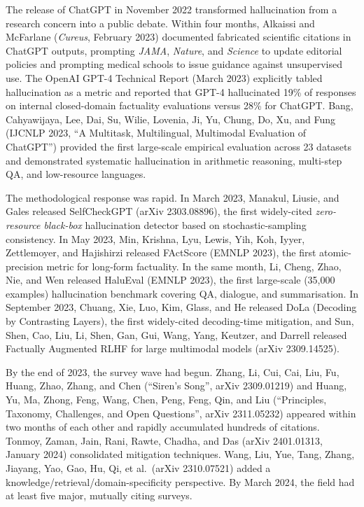 The release of ChatGPT in November 2022 transformed hallucination from a research concern into a public debate. Within four months, Alkaissi and McFarlane (\emph{Cureus}, February 2023) documented fabricated scientific citations in ChatGPT outputs, prompting \emph{JAMA}, \emph{Nature}, and \emph{Science} to update editorial policies and prompting medical schools to issue guidance against unsupervised use. The OpenAI GPT-4 Technical Report (March 2023) explicitly tabled hallucination as a metric and reported that GPT-4 hallucinated 19\% of responses on internal closed-domain factuality evaluations versus 28\% for ChatGPT. Bang, Cahyawijaya, Lee, Dai, Su, Wilie, Lovenia, Ji, Yu, Chung, Do, Xu, and Fung (IJCNLP 2023, ``A Multitask, Multilingual, Multimodal Evaluation of ChatGPT'') provided the first large-scale empirical evaluation across 23 datasets and demonstrated systematic hallucination in arithmetic reasoning, multi-step QA, and low-resource languages.

The methodological response was rapid. In March 2023, Manakul, Liusie, and Gales released SelfCheckGPT (arXiv 2303.08896), the first widely-cited \emph{zero-resource black-box} hallucination detector based on stochastic-sampling consistency. In May 2023, Min, Krishna, Lyu, Lewis, Yih, Koh, Iyyer, Zettlemoyer, and Hajishirzi released FActScore (EMNLP 2023), the first atomic-precision metric for long-form factuality. In the same month, Li, Cheng, Zhao, Nie, and Wen released HaluEval (EMNLP 2023), the first large-scale (35,000 examples) hallucination benchmark covering QA, dialogue, and summarisation. In September 2023, Chuang, Xie, Luo, Kim, Glass, and He released DoLa (Decoding by Contrasting Layers), the first widely-cited decoding-time mitigation, and Sun, Shen, Cao, Liu, Li, Shen, Gan, Gui, Wang, Yang, Keutzer, and Darrell released Factually Augmented RLHF for large multimodal models (arXiv 2309.14525).

By the end of 2023, the survey wave had begun. Zhang, Li, Cui, Cai, Liu, Fu, Huang, Zhao, Zhang, and Chen (``Siren's Song'', arXiv 2309.01219) and Huang, Yu, Ma, Zhong, Feng, Wang, Chen, Peng, Feng, Qin, and Liu (``Principles, Taxonomy, Challenges, and Open Questions'', arXiv 2311.05232) appeared within two months of each other and rapidly accumulated hundreds of citations. Tonmoy, Zaman, Jain, Rani, Rawte, Chadha, and Das (arXiv 2401.01313, January 2024) consolidated mitigation techniques. Wang, Liu, Yue, Tang, Zhang, Jiayang, Yao, Gao, Hu, Qi, et al.~(arXiv 2310.07521) added a knowledge/retrieval/domain-specificity perspective. By March 2024, the field had at least five major, mutually citing surveys.

